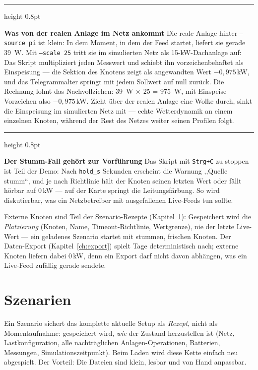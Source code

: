 \documentclass[11pt,a4paper,parskip=half]{scrreprt}
\newenvironment{beispiel}[1][Beispiel]
  {\par\medskip
   {\color{bsp}\hrule height 0.8pt}\nopagebreak\smallskip
   \noindent\textbf{\textsf{\textcolor{bsp}{#1}}}\quad\ignorespaces}
  {\par\nopagebreak\smallskip{\color{bsp}\hrule height 0.8pt}\par\medskip}
\begin{document}
\begin{beispiel}[Was von der realen Anlage im Netz ankommt]
Die reale Anlage hinter \texttt{--source pi} ist klein: In dem
Moment, in dem der Feed startet, liefert sie gerade 39~W. Mit
\texttt{--scale 25} tritt sie im simulierten Netz als
15-kW-Dachanlage auf: Das Skript multipliziert jeden Messwert und
schiebt ihn vorzeichenbehaftet als Einspeisung --- die Sektion des
Knotens zeigt als angewandten Wert $-0{,}975$\,kW, und das
Telegrammalter springt mit jedem Sollwert auf null zurück. Die
Rechnung lohnt das Nachvollziehen: 39~W $\times$ 25 = 975~W, mit
Einspeise-Vorzeichen also $-0{,}975$\,kW. Zieht über der realen
Anlage eine Wolke durch, sinkt die Einspeisung im simulierten Netz
mit --- echte Wetterdynamik an einem einzelnen Knoten, während der
Rest des Netzes weiter seinen Profilen folgt.
\end{beispiel}

\begin{beispiel}[Der Stumm-Fall gehört zur Vorführung]
Das Skript mit \texttt{Strg+C} zu stoppen ist Teil der Demo: Nach
\texttt{hold\_s} Sekunden erscheint die Warnung ,,Quelle stumm``, und
je nach Richtlinie hält der Knoten seinen letzten Wert oder fällt
hörbar auf 0\,kW --- auf der Karte springt die Leitungsfärbung. So
wird diskutierbar, was ein Netzbetreiber mit ausgefallenen
Live-Feeds tun sollte.
\end{beispiel}

Externe Knoten sind Teil der Szenario-Rezepte
(Kapitel~\ref{ch:scenarios}): Gespeichert wird die \emph{Platzierung}
(Knoten, Name, Timeout-Richtlinie, Wertgrenze), nie der letzte
Live-Wert --- ein geladenes Szenario startet mit stummen, frischen
Knoten. Der Daten-Export (Kapitel~\ref{ch:export}) spielt Tage
deterministisch nach; externe Knoten liefern dabei 0\,kW, denn ein
Export darf nicht davon abhängen, was ein Live-Feed zufällig gerade
sendete.

\chapter{Szenarien}
\label{ch:scenarios}

Ein Szenario sichert das komplette aktuelle Setup als
\emph{Rezept}, nicht als Momentaufnahme: gespeichert wird, \emph{wie}
der Zustand herzustellen ist (Netz, Lastkonfiguration, alle
nachträglichen Anlagen-Operationen, Batterien, Messungen,
Simulationszeitpunkt). Beim Laden wird diese Kette einfach neu
abgespielt. Der Vorteil: Die Dateien sind klein, lesbar und von Hand
anpassbar.
\end{document}
